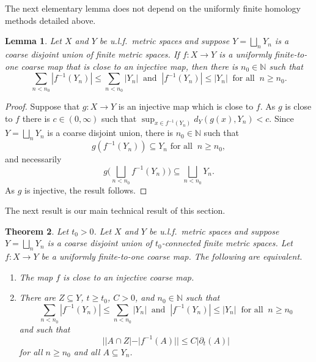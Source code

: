 \documentclass[11pt]{amsart}
\newcommand{\N}{\mathbb{N}}
\numberwithin{equation}{section}
\newtheorem{theorem}{Theorem}[section]
\newtheorem{lemma}[theorem]{Lemma}
\theoremstyle{definition}
\theoremstyle{remark}
\newcommand{\ri}{\partial}
\numberwithin{equation}{section}
\begin{document}
The next elementary lemma does not depend on the uniformly finite homology methods detailed above.
 
\begin{lemma}
 Let $X$ and $Y$ be u.l.f.\ metric spaces and suppose $Y=\bigsqcup_nY_n$ is a coarse disjoint union of finite metric spaces. If $f\colon X\to Y$ is a uniformly finite-to-one coarse map that is close to an injective map, then there is $n_0\in \N$ such that 
 \[\sum_{n<n_0}|f^{-1}(Y_n)|\leq \sum_{n<n_0}|Y_n| \ \text{ and } \ |f^{-1}(Y_n)|\leq |Y_{n}|\ \text{ for all } \ n\geq n_0.\]
 \label{LemmaInjCoarseClose}
\end{lemma}

\begin{proof}
 Suppose that $g\colon X\to Y$ is an injective map which is close to $f$. As $g$ is close to $f$ there is $c\in(0,\infty)$ such that $\sup_{x\in f^{-1}(Y_n)}d_Y(g(x),Y_n)<c$. Since $Y=\bigsqcup_nY_n$ is a coarse disjoint union, there is $n_0\in\N$ such that \[ g(f^{-1}(Y_n))\subseteq Y_n \text{ for all }\ n\geq n_0,\] and necessarily \[ g\Bigg(\bigsqcup_{n<n_0}f^{-1}(Y_n)\Bigg)\subseteq \bigsqcup_{n<n_0}Y_n.\]
As $g$ is injective, the result follows. 
\end{proof}

The next result is our main technical result of this section. 

\begin{theorem}
Let $t_0>0$. Let $X$ and $Y$ be u.l.f.\ metric spaces and suppose $Y=\bigsqcup_nY_n$ is a coarse disjoint union of $t_0$-connected finite metric spaces. Let $f\colon X\to Y$ be a uniformly finite-to-one coarse map. The following are equivalent.
\begin{enumerate}
\item \label{CorThm76Whyte1Item1} The map $f$ is close to an injective coarse map.
\item \label{CorThm76Whyte1Item2} There are $Z\subseteq Y$, $t\geq t_0$, $C>0$, and $n_0\in\N$ such that 
 \[\sum_{n<n_0}|f^{-1}(Y_n)|\leq \sum_{n<n_0}|Y_n| \ \text{ and } \ |f^{-1}(Y_n)|\leq |Y_{n}|\ \text{ for all } \ n\geq n_0\] and such that 
\[||A\cap Z|-|f^{-1}(A)||\leq C|\ri_{t}(A)|\]
 for all $n\geq n_0$ and all $A\subseteq Y_n$.
\end{enumerate} 
 \label{ThmThm76Whyte1}
\end{theorem}
\end{document}
